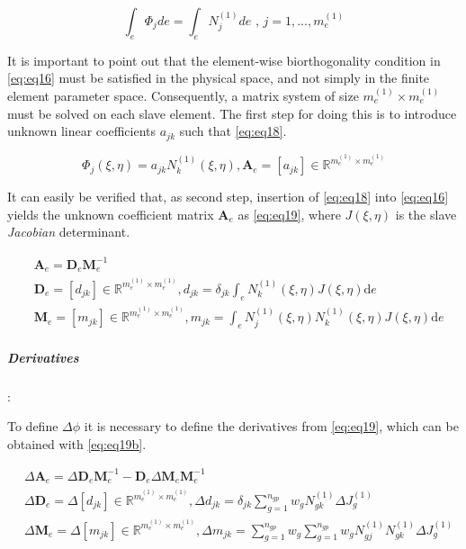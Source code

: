 \documentclass[a4paper,10pt]{article} %
\begin{document}
\begin{equation}\label{eq:eq17}
 \int_e \Phi_j de =  \int_e N_j^{(1)} de \text{ , } j=1,...,m_e^{(1)}
\end{equation}

It is important to point out that the element-wise biorthogonality condition in \eqref{eq:eq16} must be satisfied in the physical space, and not simply in the finite element parameter space. Consequently, a matrix system of size $m_e^{(1)} \times m_e^{(1)}$ must be solved on each slave element. The first step for doing this is to introduce unknown linear coefficients $a_{jk}$ such that \eqref{eq:eq18}.

\begin{equation}\label{eq:eq18}
 \Phi_j(\xi, \eta) = a_{jk} N_k^{(1)}\left(\xi, \eta \right), \mathbf{A}_e = [a_{jk}] \in \mathbb{R}^{m_e^{(1)} \times m_e^{(1)}}
 \end{equation}

 It can easily be verified that, as second step, insertion of \eqref{eq:eq18} into \eqref{eq:eq16} yields the unknown
coefficient matrix $\mathbf{A}_e$ as \eqref{eq:eq19}, where $J(\xi, \eta)$ is the slave \textit{Jacobian} determinant.

\begin{equation}\label{eq:eq19}
\begin{aligned}
 & \mathbf{A}_e = \mathbf{D}_e\mathbf{M}_e^{-1} \\
 & \mathbf{D}_e = [d_{jk}] \in \mathbb{R}^{m_e^{(1)} \times m_e^{(1)}}, d_{jk} = \delta_{jk} \int_e N_k^{(1)}(\xi, \eta) J(\xi, \eta) \text{d}e \\
 & \mathbf{M}_e = [m_{jk}] \in \mathbb{R}^{m_e^{(1)} \times m_e^{(1)}}, m_{jk} = \int_e N_j^{(1)}(\xi, \eta) N_k^{(1)}(\xi, \eta) J(\xi, \eta) \text{d}e
\end{aligned}
 \end{equation}

\subparagraph{Derivatives}:

To define $\Delta \phi$ it is necessary to define the derivatives from \eqref{eq:eq19}, which can be obtained with \eqref{eq:eq19b}.

\begin{equation}\label{eq:eq19b}
\begin{aligned}
 & \Delta \mathbf{A}_e = \Delta \mathbf{D}_e\mathbf{M}_e^{-1} - \mathbf{D}_e\Delta\mathbf{M}_e\mathbf{M}_e^{-1} \\
 &\Delta \mathbf{D}_e = \Delta[d_{jk}] \in \mathbb{R}^{m_e^{(1)} \times m_e^{(1)}}, \Delta d_{jk} = \delta_{jk} \sum_{g = 1}^{n_{gp}} w_g N_{gk}^{(1)} \Delta J_g^{(1)}  \\
 & \Delta \mathbf{M}_e = \Delta[m_{jk}] \in \mathbb{R}^{m_e^{(1)} \times m_e^{(1)}}, \Delta m_{jk} = \sum_{g = 1}^{n_{gp}} w_g  \sum_{g = 1}^{n_{gp}} w_g  N_{gj}^{(1)} N_{gk}^{(1)} \Delta J_g^{(1)}
\end{aligned}
 \end{equation}
\end{document}

